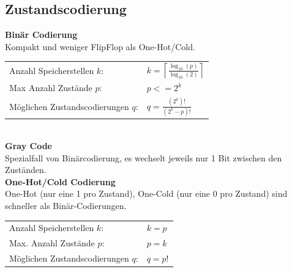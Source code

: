 \subsection{Zustandscodierung}
\noindent\textbf{Binär Codierung}\\
Kompakt und weniger FlipFlop als One-Hot/Cold.

\begin{tabular}{ll}
Anzahl Speicherstellen $k$:& $k = \left\lceil \frac{\log_{10}(p)}{\log_{10}(2)}\right\rceil$\\
Max Anzahl Zustände $p$:& $p <= 2^k$ \\
Möglichen Zustandscodierungen $q$:& $q = \frac{(2^k)!}{(2^k - p)!}$ 
\end{tabular}\\ 

\noindent\textbf{Gray Code}\\ 
Spezialfall von Binärcodierung, es wechselt jeweils nur 1 Bit zwischen den Zuständen. \\

\noindent\textbf{One-Hot/Cold Codierung}\\
One-Hot (nur eine 1 pro Zustand), One-Cold (nur eine 0 pro Zustand) sind schneller als Binär-Codierungen.

\begin{tabular}{ll}
	Anzahl Speicherstellen $k$:& $k = p$\\
	Max. Anzahl Zustände $p$:& $p = k$ \\
	Möglichen Zustandscodierungen $q$:& $q = p!$ 
\end{tabular}
